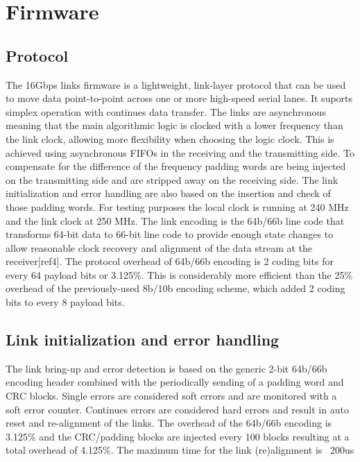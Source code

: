 \documentclass[a4paper]{PoS}
\begin{document}
\newpage

\section{Firmware}


\subsection{Protocol}
The 16Gbps links firmware is a lightweight, link-layer protocol that can be used to move data point-to-point across one or more high-speed serial lanes. It suports simplex operation with continues data transfer. The links are asynchronous meaning that the main algorithmic logic is clocked with a lower frequency than the link clock, allowing more flexibility when choosing the logic clock. This is achieved using asynchronous FIFOs in the receiving and the transmitting side. To compensate for the difference of the frequency padding words are being injected on the transmitting side and are stripped away on the receiving side. The link initialization and error handling are also based on the insertion and check of those padding words. For testing purposes the local clock is running at 240 MHz and the link clock at 250 MHz. The link encoding is the 64b/66b line code that transforms 64-bit data to 66-bit line code to provide enough state changes to allow reasonable clock recovery and alignment of the data stream at the receiver[ref4]. The protocol overhead of 64b/66b encoding is 2 coding bits for every 64 payload bits or 3.125\%. This is considerably more efficient than the 25\% overhead of the previously-used 8b/10b encoding scheme, which added 2 coding bits to every 8 payload bits.



\subsection{Link initialization and error handling}
The link bring-up and error detection is based on the generic 2-bit 64b/66b encoding header combined with the periodically sending of a padding word and CRC blocks.
Single errors are considered soft errors and are monitored with a soft error counter.
Continues errors are considered hard errors and result in auto reset and re-alignment of the links. 
The overhead of the 64b/66b encoding is 3.125\% and the CRC/padding blocks are injected every 100 blocks resulting at a total overhead of 4.125\%.
The maximum time for the link (re)alignment is ~200us
\end{document}
